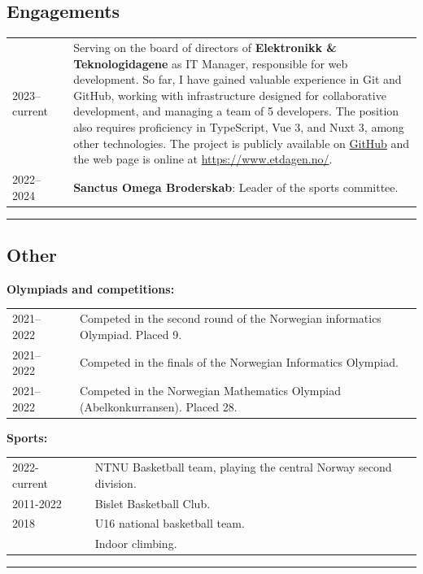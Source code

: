 \documentclass[10pt]{article}
\newlength{\cw}
\newlength{\cwl}
\begin{document}
\subsection*{Engagements}
\begin{tabular}{p{\cw} @{:}l p{\cwl}}
  2023--current & & Serving on the board of directors of \textbf{Elektronikk \& Teknologidagene} as IT Manager, responsible for web development.
  So far, I have gained valuable experience in Git and GitHub, working with infrastructure designed for collaborative development, and managing a team of 5 developers.
  The position also requires proficiency in TypeScript, Vue 3, and Nuxt 3, among other technologies.
  The project is publicly available on \href{https://github.com/et-dagen}{GitHub} and the web page is online at \href{https://www.etdagen.no/}{https://www.etdagen.no/}.
  \\
  2022--2024 & & \textbf{Sanctus Omega Broderskab}: Leader of the sports committee.\\
\end{tabular}
\vspace{0.1cm}
\hrule
\vspace{0.1cm}

\newpage

\subsection*{Other}
\textbf{Olympiads and competitions:}

\begin{tabular}{p{\cw} @{:}l p{\cwl}}
  2021--2022 & & Competed in the second round of the Norwegian informatics Olympiad. Placed 9.\\
  2021--2022 & & Competed in the finals of the Norwegian Informatics Olympiad.\\
  2021--2022 & & Competed in the Norwegian Mathematics Olympiad (Abelkonkurransen). Placed 28.\\
\end{tabular}

\textbf{Sports:}

\begin{tabular}{p{\cw} @{:}l p{\cwl}}
  2022-current & & NTNU Basketball team, playing the central Norway second division.\\
  2011-2022 & & Bislet Basketball Club.\\
  2018 & & U16 national basketball team. \\
   & & Indoor climbing. \\
\end{tabular}
\vspace{0.1cm}
\hrule
\vspace{0.1cm}

\end{document}
